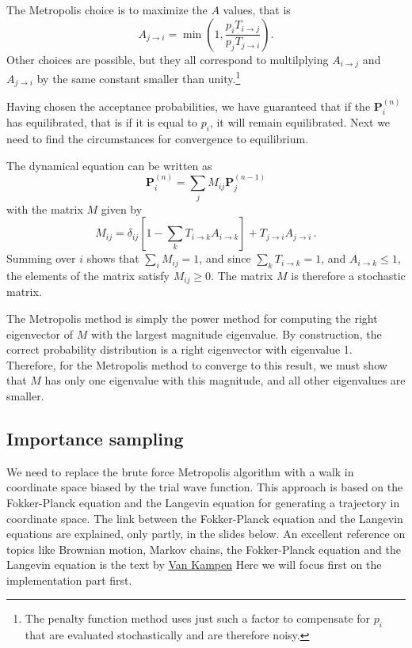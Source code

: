 \documentclass[%
oneside,                 %
final,                   %
10pt]{article}
\begin{document}
The Metropolis choice is to maximize the $A$ values, that is
\[
A_{j \rightarrow i} = \min \left ( 1,
\frac{p_iT_{i\rightarrow j}}{ p_jT_{j\rightarrow i}}\right ).
\]
Other choices are possible, but they all correspond to multilplying
$A_{i\rightarrow j}$ and $A_{j\rightarrow i}$ by the same constant
smaller than unity.\footnote{The penalty function method uses just such
a factor to compensate for $p_i$ that are evaluated stochastically
and are therefore noisy.}

Having chosen the acceptance probabilities, we have guaranteed that
if the  $\mathbf{P}_i^{(n)}$ has equilibrated, that is if it is equal to $p_i$,
it will remain equilibrated. Next we need to find the circumstances for
convergence to equilibrium.

The dynamical equation can be written as
\[
\mathbf{P}^{(n)}_i = \sum_j M_{ij}\mathbf{P}^{(n-1)}_j
\]
with the matrix $M$ given by
\[
M_{ij} = \delta_{ij}\left [ 1 -\sum_k T_{i\rightarrow k} A_{i \rightarrow k}
\right ] + T_{j\rightarrow i} A_{j\rightarrow i} \,.
\]
Summing over $i$ shows that $\sum_i M_{ij} = 1$, and since
$\sum_k T_{i\rightarrow k} = 1$, and $A_{i \rightarrow k} \leq 1$, the
elements of the matrix satisfy $M_{ij} \geq 0$. The matrix $M$ is therefore
a stochastic matrix.

The Metropolis method is simply the power method for computing the
right eigenvector of $M$ with the largest magnitude eigenvalue.
By construction, the correct probability distribution is a right eigenvector
with eigenvalue 1. Therefore, for the Metropolis method to converge
to this result, we must show that $M$ has only one eigenvalue with this
magnitude, and all other eigenvalues are smaller.

\subsection*{Importance sampling}

We need to replace the brute force
Metropolis algorithm with a walk in coordinate space biased by the trial wave function.
This approach is based on the Fokker-Planck equation and the Langevin equation for generating a trajectory in coordinate space.  The link between the Fokker-Planck equation and the Langevin equations are explained, only partly, in the slides below.
An excellent reference on topics like Brownian motion, Markov chains, the Fokker-Planck equation and the Langevin equation is the text by  \href{{http://www.elsevier.com/books/stochastic-processes-in-physics-and-chemistry/van-kampen/978-0-444-52965-7}}{Van Kampen}
Here we will focus first on the implementation part first.
\end{document}

